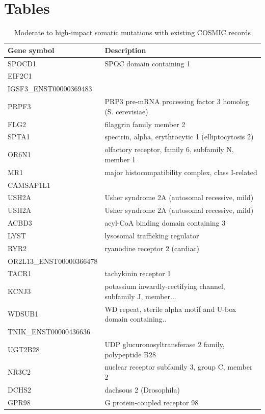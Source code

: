 \documentclass[10pt]{article}
\begin{document}
\section*{Tables}
\begin{table}[ht] 
\tiny
\caption{Moderate to high-impact somatic mutations with existing COSMIC records} %
\centering %
\begin{tabular}{l l} %
\hline
Gene symbol & Description \\ [0.5ex] %
\hline %
SPOCD1 & SPOC domain containing 1 \\
EIF2C1 &  \\
IGSF3\_ENST00000369483 &  \\
PRPF3 & PRP3 pre-mRNA processing factor 3 homolog (S. cerevisiae) \\
FLG2 & filaggrin family member 2 \\
SPTA1 & spectrin, alpha, erythrocytic 1 (elliptocytosis 2) \\
OR6N1 & olfactory receptor, family 6, subfamily N, member 1 \\
MR1 & major histocompatibility complex, class I-related \\
CAMSAP1L1 &  \\
USH2A & Usher syndrome 2A (autosomal recessive, mild) \\
USH2A & Usher syndrome 2A (autosomal recessive, mild) \\
ACBD3 & acyl-CoA binding domain containing 3 \\
LYST & lysosomal trafficking regulator \\
RYR2 & ryanodine receptor 2 (cardiac) \\
OR2L13\_ENST00000366478 &  \\
TACR1 & tachykinin receptor 1 \\
KCNJ3 & potassium inwardly-rectifying channel, subfamily J, member... \\
WDSUB1 & WD repeat, sterile alpha motif and U-box domain containing.. \\
TNIK\_ENST00000436636 &  \\
UGT2B28 & UDP glucuronosyltransferase 2 family, polypeptide B28 \\
NR3C2 & nuclear receptor subfamily 3, group C, member 2 \\
DCHS2 & dachsous 2 (Drosophila) \\
GPR98 & G protein-coupled receptor 98 \\

\end{tabular}
\end{table}
\end{document}
